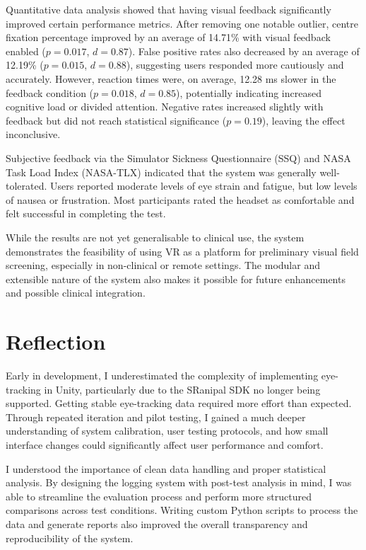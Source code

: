 \documentclass{l4proj}
\begin{document}
Quantitative data analysis showed that having visual feedback significantly improved certain performance metrics. After removing one notable outlier, centre fixation percentage improved by an average of 14.71\% with visual feedback enabled ($p = 0.017$, $d = 0.87$). False positive rates also decreased by an average of 12.19\% ($p = 0.015$, $d = 0.88$), suggesting users responded more cautiously and accurately. However, reaction times were, on average, 12.28 ms slower in the feedback condition ($p = 0.018$, $d = 0.85$), potentially indicating increased cognitive load or divided attention. Negative rates increased slightly with feedback but did not reach statistical significance ($p = 0.19$), leaving the effect inconclusive.

Subjective feedback via the Simulator Sickness Questionnaire (SSQ) and NASA Task Load Index (NASA-TLX) indicated that the system was generally well-tolerated. Users reported moderate levels of eye strain and fatigue, but low levels of nausea or frustration. Most participants rated the headset as comfortable and felt successful in completing the test.

While the results are not yet generalisable to clinical use, the system demonstrates the feasibility of using VR as a platform for preliminary visual field screening, especially in non-clinical or remote settings. The modular and extensible nature of the system also makes it possible for future enhancements and possible clinical integration. 

\section{Reflection}
Early in development, I underestimated the complexity of implementing eye-tracking in Unity, particularly due to the SRanipal SDK no longer being supported. Getting stable eye-tracking data required more effort than expected. Through repeated iteration and pilot testing, I gained a much deeper understanding of system calibration, user testing protocols, and how small interface changes could significantly affect user performance and comfort.

I understood the importance of clean data handling and proper statistical analysis. By designing the logging system with post-test analysis in mind, I was able to streamline the evaluation process and perform more structured comparisons across test conditions. Writing custom Python scripts to process the data and generate reports also improved the overall transparency and reproducibility of the system.
\end{document}
